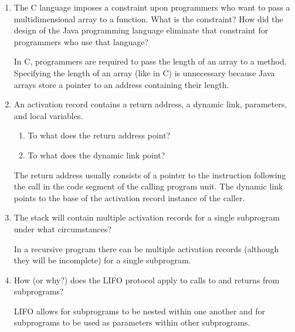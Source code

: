 \begin{enumerate}
\begin{answer}
    \end{answer}
 
  \item The C language imposes a constraint upon programmers
    who want to pass a multidimensional array to a function.
    What is the constraint? How did the design of the Java
    programming language eliminate that constraint for 
    programmers who use that language?
    
    \begin{answer}
    
    In C, programmers are required to pass the length of an array to a method. Specifying the length of an array (like in C) is unnecessary because Java arrays store a pointer to an address containing their length.

    \end{answer}

  \item An activation record contains a return
    address, a dynamic link, parameters, and
    local variables.
  \begin{enumerate}
    \item To what does the return address point?
    \item To what does the dynamic link point?
    \end{enumerate}
    
    \begin{answer}
    
The return address usually consists of a pointer to the instruction following the call in the code segment of the calling program unit.  The dynamic link points to the base of the activation record instance of the caller.

    \end{answer}

  \item The stack will contain multiple activation
    records for a single subprogram under what
    circumstances?
    
    \begin{answer}
    In a recursive program there can be multiple activation records (although they will be incomplete) for a single subprogram.
    \end{answer}

  \item How (or why?) does the LIFO protocol apply to
    calls to and returns from subprograms?
    
    \begin{answer}
    LIFO allows for subprograms to be nested within one another and for subprograms to be used as parameters within other subprograms.
    \end{answer}


\end{enumerate}
